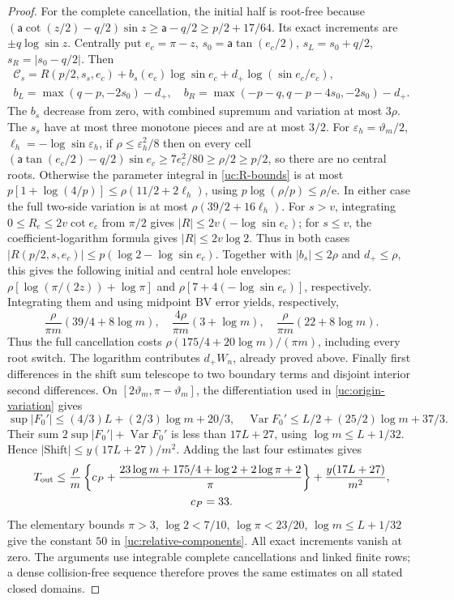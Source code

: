 \begin{proof}
For the complete cancellation, the initial half is root-free because
$(\mathsf{a}\cot(z/2)-q/2)\sin z\geq \mathsf{a}-q/2\geq p/2+17/64$.
Its exact increments are $\pm q\log\sin z$.
Centrally put $e_c=\pi-z$, $s_0=\mathsf{a}\tan(e_c/2)$,
$s_L=s_0+q/2$, $s_R=|s_0-q/2|$. Then
\[
 \begin{gathered}
 \mathcal C_s=R(p/2,s_s,e_c)+b_s(e_c)\log\sin e_c
                                  +d_+\log(\sin e_c/e_c),\\
 b_L=\max(q-p,-2s_0)-d_+,
 \quad b_R=\max(-p-q,q-p-4s_0,-2s_0)-d_+.
 \end{gathered}
\]
The $b_s$ decrease from zero, with combined supremum and variation
at most $3\rho$. The $s_s$ have at most three monotone pieces and
are at most $3/2$. For $\varepsilon_h=\vartheta_m/2$, $\ell_h=-\log\sin\varepsilon_h$,
if $\rho\leq\varepsilon_h^2/8$ then on every cell
$(\mathsf{a}\tan(e_c/2)-q/2)\sin e_c\geq7e_c^2/80\geq\rho/2\geq p/2$,
so there are no central roots. Otherwise the parameter integral in
\eqref{uc:R-bounds} is at most
$p[1+\log(4/p)]\leq\rho(11/2+2\ell_h)$, using
$p\log(\rho/p)\leq\rho/\mathrm e$.
In either case the full two-side variation is at most
$\rho(39/2+16\ell_h)$. For $s>v$, integrating $0\leq R_e\leq2v\cot e_c$ from $\pi/2$
gives $|R|\leq2v(-\log\sin e_c)$; for $s\leq v$, the coefficient-logarithm
formula gives $|R|\leq2v\log2$. Thus in both cases
$|R(p/2,s,e_c)|\leq p(\log2-\log\sin e_c)$. Together with
$|b_s|\leq2\rho$ and $d_+\leq\rho$, this gives the following
initial and central hole envelopes:
$\rho[\log(\pi/(2z))+\log\pi]$ and
$\rho[7+4(-\log\sin e_c)]$, respectively. Integrating them and
using midpoint BV error yields, respectively,
\[
 \frac\rho{\pi m}(39/4+8\log m),\quad
 \frac{4\rho}{\pi m}(3+\log m),\quad
 \frac\rho{\pi m}(22+8\log m).
\]
Thus the full cancellation costs
$\rho(175/4+20\log m)/(\pi m)$, including every root switch.
The logarithm contributes $d_+W_n$, already proved above.
Finally first differences in the shift sum telescope to two boundary
terms and disjoint interior second differences. On $[2\vartheta_m,\pi-\vartheta_m]$,
the differentiation used in \eqref{uc:origin-variation} gives
\[
 \sup|F_0'|\leq(4/3)L+(2/3)\log m+20/3,\quad
 \operatorname{Var}F_0'\leq L/2+(25/2)\log m+37/3.
\]
Their sum $2\sup|F_0'|+\operatorname{Var}F_0'$ is less than
$17L+27$, using $\log m\leq L+1/32$. Hence
$|\mathrm{Shift}|\leq y(17L+27)/m^2$.
Adding the last four estimates gives
\[
 \begin{gathered}
 T_{\rm out}\leq\frac\rho m
 \left\{c_P+\frac{23\log m+175/4+\log2+2\log\pi+2}\pi\right\}
                  +\frac{y(17L+27)}{m^2},\\ c_P=33.
 \end{gathered}
\]
The elementary bounds $\pi>3$, $\log2<7/10$,
$\log\pi<23/20$, $\log m\leq L+1/32$ give the constant $50$
in \eqref{uc:relative-components}. All exact increments vanish at
zero. The arguments use integrable complete cancellations and linked
finite rows; a dense collision-free sequence therefore proves the
same estimates on all stated closed domains.


\end{proof}
